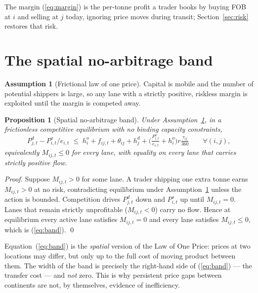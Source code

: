\documentclass[11pt]{article}
\theoremstyle{definition}
\newtheorem{assumption}{Assumption}
\theoremstyle{plain}
\newtheorem{proposition}{Proposition}
\begin{document}
The margin (\ref{eq:margin}) is the per-tonne profit a trader books by buying
FOB at $i$ and selling at $j$ today, ignoring price moves during transit;
Section~\ref{sec:risk} restores that risk.

\section{The spatial no-arbitrage band}
\label{sec:noarb}

\begin{assumption}[Frictional law of one price]
\label{ass:lop}
Capital is mobile and the number of potential shippers is large, so any lane
with a strictly positive, riskless margin is exploited until the margin is
competed away.
\end{assumption}

\begin{proposition}[Spatial no-arbitrage band]
\label{prop:band}
Under Assumption~\ref{ass:lop}, in a frictionless competitive equilibrium with
no binding capacity constraints,
\begin{equation}
P^{d}_{j,t}-P^{o}_{i,t}/e_{i,t}\;\le\; h^o_i+f_{ij,t}+\theta_{ij}+h^d_j
+\Big(\tfrac{P^o_{i,t}}{e_{i,t}}+h^o_i\Big) r\tfrac{\tau_{ij}}{360}
\qquad\forall (i,j),
\label{eq:band}
\end{equation}
equivalently $M_{ij,t}\le 0$ for every lane, with equality on every lane that
carries strictly positive flow.
\end{proposition}

\begin{proof}
Suppose $M_{ij,t}>0$ for some lane. A trader shipping one extra tonne earns
$M_{ij,t}>0$ at no risk, contradicting equilibrium under
Assumption~\ref{ass:lop} unless the action is bounded. Competition drives
$P^d_{j,t}$ down and $P^o_{i,t}$ up until $M_{ij,t}=0$. Lanes that remain
strictly unprofitable ($M_{ij,t}<0$) carry no flow. Hence at equilibrium every
active lane satisfies $M_{ij,t}=0$ and every lane satisfies
$M_{ij,t}\le 0$, which is (\ref{eq:band}). \qed
\end{proof}

Equation~(\ref{eq:band}) is the \emph{spatial} version of the Law of One Price:
prices at two locations may differ, but only up to the full cost of moving
product between them. The width of the band is precisely the right-hand side of
(\ref{eq:band}) --- the transfer cost --- and \emph{not} zero. This is why
persistent price gaps between continents are not, by themselves, evidence of
inefficiency.
\end{document}
